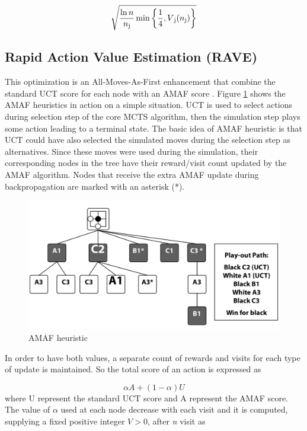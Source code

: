 \begin{equation}\label{ucb1tuned}
    \sqrt{\frac{\ln{n}}{n\textsubscript{j}}\min\left\{\frac{1}{4}, V\textsubscript{j}(n\textsubscript{j})\right\}}
\end{equation}

\subsection{Rapid Action Value Estimation (RAVE)}\label{sec:rave}
This optimization is an All-Moves-As-First enhancement that combine the standard UCT score for each node with an AMAF score \cite{conf/icai/HelmboldP09}.
Figure \ref{fig:AMAFheuristic} shows the AMAF heuristics in action on a simple situation. UCT is used to select actions during selection step of the core MCTS algorithm, then the simulation step plays some action leading to a terminal state. The basic idea of AMAF heuristic is that UCT could have also selected the simulated moves during the selection step as alternatives. Since these moves were used during the simulation, their corresponding nodes in the tree have their reward/visit count updated by the AMAF algorithm. Nodes that receive the extra AMAF update during backpropagation are marked with an asterisk (*).
\begin{figure}[ht]
\begin{center}
\includegraphics[width=\textwidth]{pictures/AMAF.png}
\end{center}
\caption[AMAF heuristic]{AMAF heuristic \cite{conf/icai/HelmboldP09}}
\label{fig:AMAFheuristic}
\end{figure}
In order to have both values, a separate count of rewards and visits for each type of update is maintained. So the total score of an action is expressed as

\begin{equation}
    \alpha A + (1 - \alpha) U
\end{equation}
where U represent the standard UCT score and A represent the AMAF score.
The value of $\alpha$ used at each node decrease with each visit and it is computed, supplying a fixed positive integer $V>0$, after \textit{n} visit as \cite{conf/icai/HelmboldP09}

